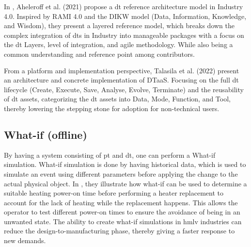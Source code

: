 In \cite{AHELEROFF2021101225}, Aheleroff et al. (2021) propose a \ac{dt} reference architecture model in Industry 4.0.
Inspired by RAMI 4.0 and the DIKW model (Data, Information, Knowledge, and Wisdom), they present a layered reference model, which breaks down the complex integration of \ac{dt}s in Industry into manageable packages with a focus on the \ac{dt} Layers, level of integration, and agile methodology.
While also being a common understanding and reference point among contributors. 

From a platform and implementation perspective, Talasila et al. (2022) \cite{auDTaaS10448890} present an architecture and concrete implementation of DTaaS.
Focusing on the full \ac{dt} lifecycle (Create, Execute, Save, Analyse, Evolve, Terminate) and the reusability of \ac{dt} assets, categorizing the \ac{dt} assets into Data, Mode, Function, and Tool, thereby lowering the stepping stone for adoption for non-technical users. 

\subsection{What-if (offline)}
By having a system consisting of \ac{pt} and \ac{dt}, one can perform a What-if simulation.
What-if simulation is done by having historical data, which is used to simulate an event using different parameters before applying the change to the actual physical object.
In \cite{Frasheri2024}, they illustrate how what-if can be used to determine a suitable heating power-on time before performing a heater replacement to account for the lack of heating while the replacement happens.
This allows the operator to test different power-on times to ensure the avoidance of being in an unwanted state. The ability to create what-if simulations in \ac{hmlv} industries can reduce the design-to-manufacturing phase, thereby giving a faster response to new demands. 

